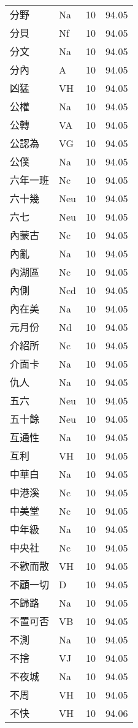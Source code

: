 \documentclass[twocolumn]{book}
\begin{document}
\begin{supertabular}{llrr}
分野 & Na & 10 &  94.05\\
分貝 & Nf & 10 &  94.05\\
分文 & Na & 10 &  94.05\\
分內 & A & 10 &  94.05\\
凶猛 & VH & 10 &  94.05\\
公權 & Na & 10 &  94.05\\
公轉 & VA & 10 &  94.05\\
公認為 & VG & 10 &  94.05\\
公僕 & Na & 10 &  94.05\\
六年一班 & Nc & 10 &  94.05\\
六十幾 & Neu & 10 &  94.05\\
六七 & Neu & 10 &  94.05\\
內蒙古 & Nc & 10 &  94.05\\
內亂 & Na & 10 &  94.05\\
內湖區 & Nc & 10 &  94.05\\
內側 & Ncd & 10 &  94.05\\
內在美 & Na & 10 &  94.05\\
元月份 & Nd & 10 &  94.05\\
介紹所 & Nc & 10 &  94.05\\
介面卡 & Na & 10 &  94.05\\
仇人 & Na & 10 &  94.05\\
五六 & Neu & 10 &  94.05\\
五十餘 & Neu & 10 &  94.05\\
互通性 & Na & 10 &  94.05\\
互利 & VH & 10 &  94.05\\
中華白 & Na & 10 &  94.05\\
中港溪 & Nc & 10 &  94.05\\
中美堂 & Nc & 10 &  94.05\\
中年級 & Na & 10 &  94.05\\
中央社 & Nc & 10 &  94.05\\
不歡而散 & VH & 10 &  94.05\\
不顧一切 & D & 10 &  94.05\\
不歸路 & Na & 10 &  94.05\\
不置可否 & VB & 10 &  94.05\\
不測 & Na & 10 &  94.05\\
不捨 & VJ & 10 &  94.05\\
不夜城 & Na & 10 &  94.05\\
不周 & VH & 10 &  94.05\\
不快 & VH & 10 &  94.06\\

\end{supertabular}
\end{document}
